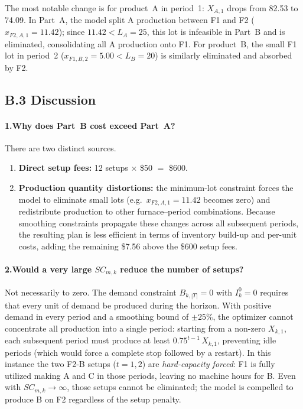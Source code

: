 \documentclass[11pt,a4paper]{article}
\begin{document}
The most notable change is for product~A in period~1: $X_{A,1}$ drops from
82.53 to 74.09.  In Part~A, the model split A production between F1 and F2
($x_{F2,A,1}=11.42$); since $11.42 < L_A = 25$, this lot is infeasible in
Part~B and is eliminated, consolidating all A production onto F1.  For
product~B, the small F1 lot in period~2 ($x_{F1,B,2}=5.00 < L_B=20$)
is similarly eliminated and absorbed by F2.

\subsection{B.3\; Discussion}

\paragraph{1.\;Why does Part~B cost exceed Part~A?}
There are two distinct sources.
\begin{enumerate}
  \item \textbf{Direct setup fees:} 12 setups $\times$ \$50 $=$ \$600.
  \item \textbf{Production quantity distortions:} the minimum-lot constraint
    forces the model to eliminate small lots (e.g.\ $x_{F2,A,1}=11.42$
    becomes zero) and redistribute production to other furnace--period
    combinations.  Because smoothing constraints propagate these changes
    across all subsequent periods, the resulting plan is less efficient in
    terms of inventory build-up and per-unit costs, adding the remaining
    \$7.56 above the \$600 setup fees.
\end{enumerate}

\paragraph{2.\;Would a very large $SC_{m,k}$ reduce the number of setups?}
Not necessarily to zero.  The demand constraint $B_{k,|T|}=0$ with
$I^0_k=0$ requires that every unit of demand be produced during the horizon.
With positive demand in every period and a smoothing bound of $\pm 25\%$, the
optimizer cannot concentrate all production into a single period: starting
from a non-zero $X_{k,1}$, each subsequent period must produce at least
$0.75^{t-1}\,X_{k,1}$, preventing idle periods (which would force a complete
stop followed by a restart).  In this instance the two F2-B setups
($t=1,2$) are \emph{hard-capacity forced}: F1 is fully utilized making A
and C in those periods, leaving no machine hours for B.  Even with
$SC_{m,k}\to\infty$, those setups cannot be eliminated; the model is
compelled to produce B on F2 regardless of the setup penalty.
\end{document}
